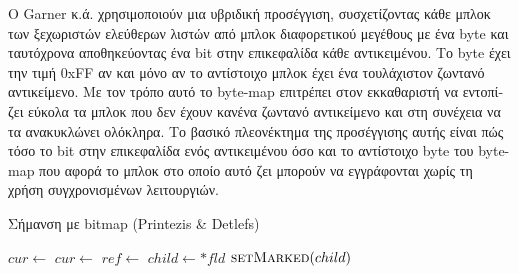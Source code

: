 \begin{greek}
Ο Garner κ.ά. \cite{DBLP:conf/iwmm/GarnerBF07} χρησιμοποιούν μια
υβριδική προσέγγιση, συσχετίζοντας κάθε μπλοκ των ξεχωριστών 
ελεύθερων λιστών από μπλοκ διαφορετικού μεγέθους με ένα byte
και ταυτόχρονα αποθηκεύοντας ένα bit στην επικεφαλίδα κάθε
αντικειμένου. Το byte έχει την τιμή 0xFF αν και μόνο αν το
αντίστοιχο μπλοκ έχει ένα τουλάχιστον ζωντανό αντικείμενο.
Με τον τρόπο αυτό το byte-map επιτρέπει στον εκκαθαριστή να
εντοπίζει εύκολα τα μπλοκ που δεν έχουν κανένα ζωντανό αντικείμενο
και στη συνέχεια να τα ανακυκλώνει ολόκληρα. Το βασικό πλεονέκτημα
της προσέγγισης αυτής είναι πώς τόσο το bit στην επικεφαλίδα ενός 
αντικειμένου όσο και το αντίστοιχο byte του byte-map που αφορά
το μπλοκ στο οποίο αυτό ζει μπορούν να εγγράφονται χωρίς τη
χρήση συγχρονισμένων λειτουργιών.

\begin{algorithm}[H]
  \caption{Σήμανση με bitmap (Printezis \& Detlefs)}
  \label{alg:ms_4}
  \begin{algorithmic}[1]
      \State $cur \gets$ 
        \State {}
        \State {}
        \State $cur \gets$ 
      \EndWhile
    \EndProcedure
    \Statex
        \State $ref \gets$ 
          \State $child \gets *fld$
            \State $\Call{setMarked}{child}$
              \State {}
            \EndIf
          \EndIf
        \EndFor
      \EndWhile
    \EndProcedure
  \end{algorithmic}
\end{algorithm}


\end{greek}
